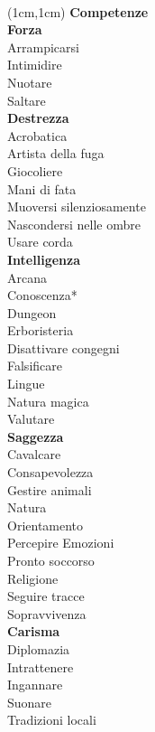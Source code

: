 \documentclass[a4paper,12 pt,openany]{book}
\begin{document}
	~\newpage

		\begin{textblock*}{4cm}(1cm,1cm) %
		{\textbf{Competenze}\\
			\footnotesize
			\textbf{Forza}\\
			Arrampicarsi\\
			Intimidire\\
			Nuotare\\
			Saltare	\\
			\textbf{Destrezza}\\
			Acrobatica\\
			Artista della fuga\\
			Giocoliere\\
			Mani di fata\\
			Muoversi silenziosamente\\
			Nascondersi nelle ombre\\
			Usare corda	\\
			\textbf{Intelligenza}\\
			Arcana\\
			Conoscenza*\\
			Dungeon\\
			Erboristeria\\
			Disattivare congegni\\
			Falsificare\\
			Lingue\\
			Natura magica\\
			Valutare\\
			\textbf{Saggezza}\\
			Cavalcare\\
			Consapevolezza\\
			Gestire animali\\
			Natura\\
			Orientamento\\
			Percepire Emozioni\\
			Pronto soccorso\\
			Religione\\
			Seguire tracce\\
			Sopravvivenza\\
			\textbf{Carisma}\\
			Diplomazia\\
			Intrattenere\\
			Ingannare\\
			Suonare\\
			Tradizioni locali
		}

	\end{textblock*}
\end{document}
